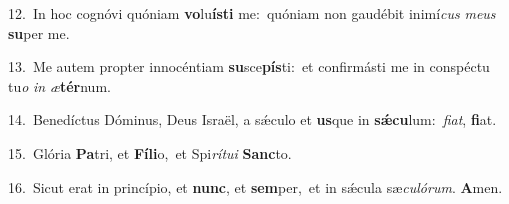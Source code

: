 {\numbfont\textcolor{\numbcolor}{12.}}~In hoc cognóvi quóniam \textbf{vo}\-lu\-\textbf{ís}\-\textbf{ti} me:~\star quóniam non gaudébit inimí\textit{cus} \textit{me}\-\textit{us} \textbf{su}\-per me.\par
{\numbfont\textcolor{\numbcolor}{13.}}~Me autem propter innocéntiam \textbf{su}\-sce\-\textbf{pís}\-ti:~\star et confirmásti me in conspéctu tu\textit{o} \textit{in} \textit{æ}\-\textbf{tér}num.\par
{\numbfont\textcolor{\numbcolor}{14.}}~Benedíctus Dóminus, Deus Israël, a sǽculo et \textbf{us}\-que in \textbf{sǽ}\-\textbf{cu}lum:~\star \textit{fi}\-\textit{at}, \textbf{fi}\-at.\par
{\numbfont\textcolor{\numbcolor}{15.}}~Glória \textbf{Pa}\-tri, et \textbf{Fí}\-\textbf{li}o,~\star et Spi\-\textit{rí}\-\textit{tu}\textit{i} \textbf{Sanc}\-to.\par
{\numbfont\textcolor{\numbcolor}{16.}}~Sicut erat in princípio, et \textbf{nunc}\-, et \textbf{sem}\-per,~\star et in sǽcula sæ\-\textit{cu}\-\textit{ló}\textit{rum}. \textbf{A}\-men.\par
